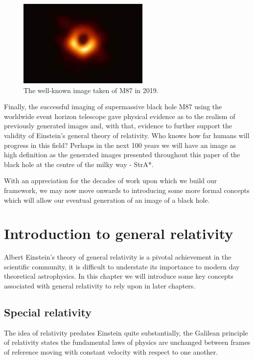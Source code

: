\documentclass[oneside,openright,frontopenright, singlespacing]{dmathesis}
\begin{document}
\begin{figure}[!ht]
	\centering
	\includegraphics[width=0.45\linewidth]{img/M87}
	\caption{The well-known image taken of M87 in 2019. \cite{event2019first}}
	\label{fig:Figure1.3}
\end{figure}

\vspace{1em}
	Finally, the successful imaging of supermassive black hole M87 using the worldwide event horizon telescope\cite{event2019first} gave physical evidence as to the realism of previously generated images and, with that, evidence to further support the validity of Einstein's general theory of relativity. Who knows how far humans will progress in this field? Perhaps in the next 100 years we will have an image as high definition as the generated images presented throughout this paper of the black hole at the centre of the milky way - StrA*.

\vspace{1em}
	With an appreciation for the decades of work upon which we build our framework, we may now move onwards to introducing some more formal concepts which will allow our eventual generation of an image of a black hole.





\chapter{Introduction to general relativity}\label{chap:Chapter2}
	Albert Einstein’s theory of general relativity is a pivotal achievement in the scientific community, it is difficult to understate its importance to modern day theoretical astrophysics. In this chapter we will introduce some key concepts associated with general relativity to rely upon in later chapters.

\section{Special relativity}\label{sec:Section2.1}

	The idea of relativity predates Einstein quite substantially, the Galilean principle of relativity states the fundamental laws of physics are unchanged between frames of reference moving with constant velocity with respect to one another.
\end{document}
